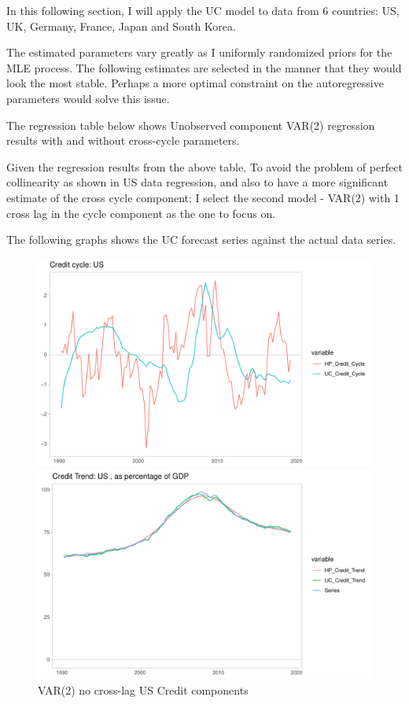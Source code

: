\documentclass[fleqn]{article}
\begin{document}
\begin{outline}[enumerate]
In this following section, I will apply the UC model to data from 6 countries: US, UK, Germany, France, Japan and South Korea.

The estimated parameters vary greatly as I uniformly randomized priors for the MLE process. The following estimates are selected in the manner that they would look the most stable. Perhaps a more optimal constraint on the autoregressive parameters would solve this issue.

The regression table below shows Unobserved component VAR(2) regression results with and without cross-cycle parameters.

\pagebreak


\clearpage

Given the regression results from the above table. To avoid the problem of perfect collinearity as shown in US data regression, and also to have a more significant estimate of the cross cycle component; I select the second model - VAR(2) with 1 cross lag in the cycle component as the one to focus on.

The following graphs shows the UC forecast series against the actual data series.

\begin{figure}[h!]
	\caption{VAR(2) no cross-lag US Credit components}	
	\centerline{\includegraphics[scale=0.7]{../Output/Graphs/Credit_cycle_US.pdf}}
	\centerline{\includegraphics[scale=0.7]{../Output/Graphs/Credit_trend_US.pdf}}
\end{figure}


\end{outline}
\end{document}
